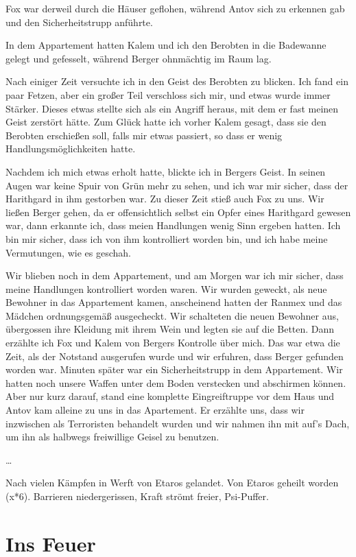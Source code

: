 \documentclass[11pt]{article}
\begin{document}
Fox war derweil durch die Häuser geflohen, während Antov sich zu
erkennen gab und den Sicherheitstrupp anführte.

In dem Appartement hatten Kalem und ich den Berobten in die Badewanne
gelegt und gefesselt, während Berger ohnmächtig im Raum lag.

Nach einiger Zeit versuchte ich in den Geist des Berobten zu blicken.
Ich fand ein paar Fetzen, aber ein großer Teil verschloss sich mir, und
etwas wurde immer Stärker. Dieses etwas stellte sich als ein Angriff
heraus, mit dem er fast meinen Geist zerstört hätte. Zum Glück hatte ich
vorher Kalem gesagt, dass sie den Berobten erschießen soll, falls mir
etwas passiert, so dass er wenig Handlungsmöglichkeiten hatte.

Nachdem ich mich etwas erholt hatte, blickte ich in Bergers Geist. In
seinen Augen war keine Spuir von Grün mehr zu sehen, und ich war mir
sicher, dass der Harithgard in ihm gestorben war. Zu dieser Zeit stieß
auch Fox zu uns. Wir ließen Berger gehen, da er offensichtlich selbst
ein Opfer eines Harithgard gewesen war, dann erkannte ich, dass meien
Handlungen wenig Sinn ergeben hatten. Ich bin mir sicher, dass ich von
ihm kontrolliert worden bin, und ich habe meine Vermutungen, wie es
geschah.

Wir blieben noch in dem Appartement, und am Morgen war ich mir sicher,
dass meine Handlungen kontrolliert worden waren. Wir wurden geweckt, als
neue Bewohner in das Appartement kamen, anscheinend hatten der Ranmex
und das Mädchen ordnungsgemäß ausgecheckt. Wir schalteten die neuen
Bewohner aus, übergossen ihre Kleidung mit ihrem Wein und legten sie auf
die Betten. Dann erzählte ich Fox und Kalem von Bergers Kontrolle über
mich. Das war etwa die Zeit, als der Notstand ausgerufen wurde und wir
erfuhren, dass Berger gefunden worden war. Minuten später war ein
Sicherheitstrupp in dem Appartement. Wir hatten noch unsere Waffen unter
dem Boden verstecken und abschirmen können. Aber nur kurz darauf, stand
eine komplette Eingreiftruppe vor dem Haus und Antov kam alleine zu uns
in das Apartement. Er erzählte uns, dass wir inzwischen als Terroristen
behandelt wurden und wir nahmen ihn mit auf's Dach, um ihn als halbwegs
freiwillige Geisel zu benutzen.

\ldots{}

Nach vielen Kämpfen in Werft von Etaros gelandet. Von Etaros geheilt
worden (x*6). Barrieren niedergerissen, Kraft strömt freier, Psi-Puffer.

\section{Ins Feuer}
\end{document}
